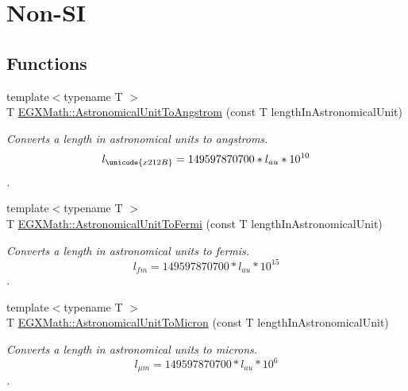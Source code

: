 \hypertarget{group___e_g_x_math-_conversions-_length_conversions-_astronomical-_astronomical_unit-_non-_s_i}{}\section{Non-\/\+SI}
\label{group___e_g_x_math-_conversions-_length_conversions-_astronomical-_astronomical_unit-_non-_s_i}
\subsection*{Functions}
\begin{DoxyCompactItemize}
\item 
{\footnotesize template$<$typename T $>$ }\\T \mbox{\hyperlink{group___e_g_x_math-_conversions-_length_conversions-_astronomical-_astronomical_unit-_non-_s_i_ga5efd14d5ca13719b7e06c4614ac0faba}{E\+G\+X\+Math\+::\+Astronomical\+Unit\+To\+Angstrom}} (const T length\+In\+Astronomical\+Unit)
\begin{DoxyCompactList}\small\item\em Converts a length in astronomical units to angstroms. \[ l_{\unicode{x212B}}=149597870700 * l_{au} * 10^{10} \]. \end{DoxyCompactList}\item 
{\footnotesize template$<$typename T $>$ }\\T \mbox{\hyperlink{group___e_g_x_math-_conversions-_length_conversions-_astronomical-_astronomical_unit-_non-_s_i_gacdf3c6bc0a49c0602d659161e6910bec}{E\+G\+X\+Math\+::\+Astronomical\+Unit\+To\+Fermi}} (const T length\+In\+Astronomical\+Unit)
\begin{DoxyCompactList}\small\item\em Converts a length in astronomical units to fermis. \[ l_{fm}=149597870700 * l_{au} * 10^{15} \]. \end{DoxyCompactList}\item 
{\footnotesize template$<$typename T $>$ }\\T \mbox{\hyperlink{group___e_g_x_math-_conversions-_length_conversions-_astronomical-_astronomical_unit-_non-_s_i_ga9fd03b0356095288ca7476121e45042d}{E\+G\+X\+Math\+::\+Astronomical\+Unit\+To\+Micron}} (const T length\+In\+Astronomical\+Unit)
\begin{DoxyCompactList}\small\item\em Converts a length in astronomical units to microns. \[ l_{\mu m}=149597870700 * l_{au} * 10^{6} \]. \end{DoxyCompactList}\item 

\end{DoxyCompactItemize}
